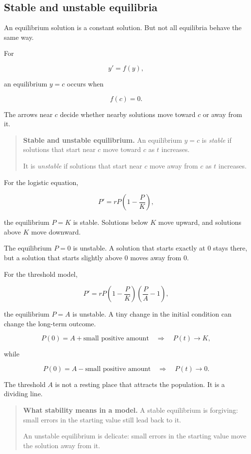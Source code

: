 \subsection{Stable and unstable equilibria}
\label{subsec:stable-unstable-equilibria}

An equilibrium solution is a constant solution.  But not all equilibria behave the same
way.

For

\[
y'=f(y),
\]

an equilibrium \(y=c\) occurs when

\[
f(c)=0.
\]

The arrows near \(c\) decide whether nearby solutions move toward \(c\) or away from it.

\begin{quote}
\textbf{Stable and unstable equilibrium.}
An equilibrium \(y=c\) is \emph{stable} if solutions that start near \(c\) move toward
\(c\) as \(t\) increases.

It is \emph{unstable} if solutions that start near \(c\) move away from \(c\) as \(t\)
increases.
\end{quote}

For the logistic equation,

\[
P'=rP\left(1-\frac{P}{K}\right),
\]

the equilibrium \(P=K\) is stable.  Solutions below \(K\) move upward, and solutions
above \(K\) move downward.

The equilibrium \(P=0\) is unstable.  A solution that starts exactly at \(0\) stays there,
but a solution that starts slightly above \(0\) moves away from \(0\).

For the threshold model,

\[
P'=rP\left(1-\frac{P}{K}\right)\left(\frac{P}{A}-1\right),
\]

the equilibrium \(P=A\) is unstable.  A tiny change in the initial condition can change
the long-term outcome.

\[
P(0)=A+\text{small positive amount}
\quad\Longrightarrow\quad
P(t)\to K,
\]

while

\[
P(0)=A-\text{small positive amount}
\quad\Longrightarrow\quad
P(t)\to0.
\]

The threshold \(A\) is not a resting place that attracts the population.  It is a dividing
line.

\begin{quote}
\textbf{What stability means in a model.}
A stable equilibrium is forgiving: small errors in the starting value still lead back to it.

An unstable equilibrium is delicate: small errors in the starting value move the solution
away from it.
\end{quote}

